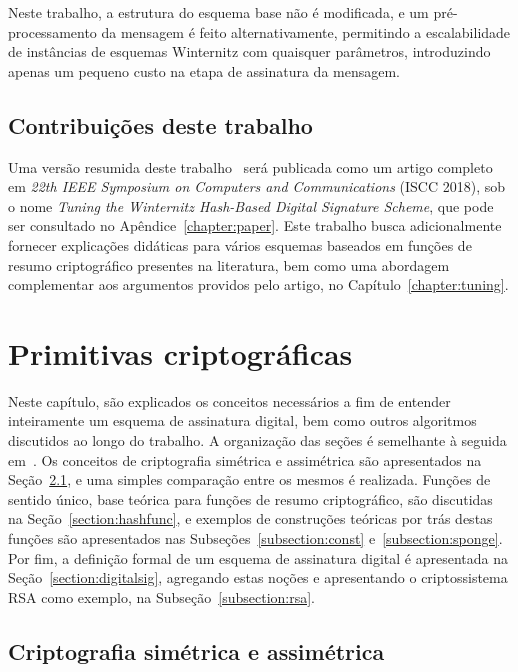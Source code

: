 \documentclass{ufsctex/ufsctex}
\begin{document}
Neste trabalho, a estrutura do esquema base não é modificada, e um
pré-processamento da mensagem é feito alternativamente, permitindo a
escalabilidade de instâncias de esquemas Winternitz com quaisquer parâmetros,
introduzindo apenas um pequeno custo na etapa de assinatura da mensagem.

\section{Contribuições deste trabalho}\label{section:contributions}

Uma versão resumida deste trabalho~\cite{Perin:inproc:2018:jun} será publicada
como um artigo completo em \emph{22th IEEE Symposium on Computers and
Communications} (ISCC 2018), sob o nome \emph{Tuning the Winternitz Hash-Based
Digital Signature Scheme}, que pode ser consultado no
Apêndice~\ref{chapter:paper}. Este trabalho busca adicionalmente fornecer
explicações didáticas para vários esquemas baseados em funções de resumo
criptográfico presentes na literatura, bem como uma abordagem complementar aos
argumentos providos pelo artigo, no Capítulo~\ref{chapter:tuning}.

\chapter{Primitivas criptográficas}\label{chapter:primitives}

Neste capítulo, são explicados os conceitos necessários a fim de entender
inteiramente um esquema de assinatura digital, bem como outros algoritmos
discutidos ao longo do trabalho. A organização das seções é semelhante à
seguida em~\cite[Capítulo 2]{Gathen:book:2015}. Os conceitos de criptografia
simétrica e assimétrica são apresentados na Seção~\ref{section:crypto}, e uma
simples comparação entre os mesmos é realizada. Funções de sentido único, base
teórica para funções de resumo criptográfico, são discutidas na
Seção~\ref{section:hashfunc}, e exemplos de construções teóricas por trás
destas funções são apresentados nas Subseções~\ref{subsection:const}
e~\ref{subsection:sponge}. Por fim, a definição formal de um esquema de
assinatura digital é apresentada na Seção~\ref{section:digitalsig}, agregando
estas noções e apresentando o criptossistema RSA como exemplo, na
Subseção~\ref{subsection:rsa}.

\section{Criptografia simétrica e assimétrica}\label{section:crypto}
\end{document}
